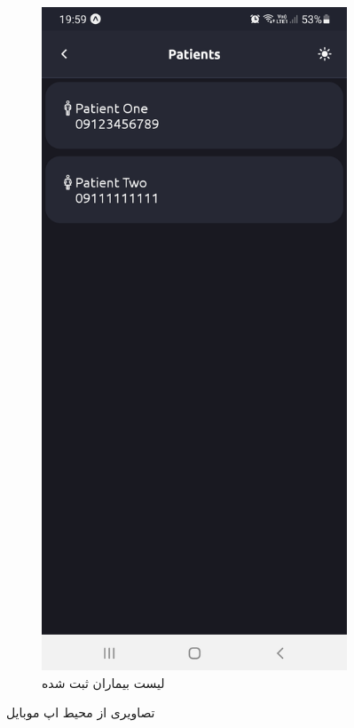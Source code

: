 \documentclass[12pt]{article}
\begin{document}
\begin{figure}[H]
\begin{center}
		\begin{subfigure}{.45\textwidth}
			\includegraphics[width=.9\linewidth]{app_patients}
			\caption{لیست بیماران ثبت شده}
		\end{subfigure}
		\caption{تصاویری از محیط اپ موبایل}
		\label{app_screenshots}
	\end{center}
\end{figure}
\end{document}

